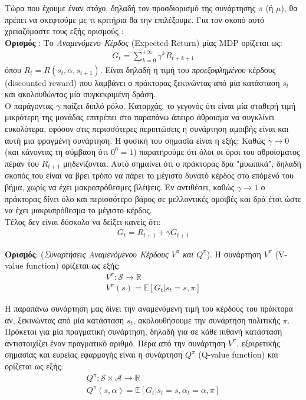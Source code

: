 \documentclass[11pt]{article} %
\numberwithin{equation}{subsection}
\begin{document}
Τώρα που έχουμε έναν στόχο, δηλαδή τον προσδιορισμό της συνάρτησης $\mathcal{\pi}$ (ή $\mu$), θα πρέπει να σκεφτούμε με τι κριτήρια θα την επιλέξουμε. Για τον σκοπό αυτό χρειαζόμαστε τους εξής ορισμούς \cite{valuefun}:\\

\textbf{Ορισμός} : Το \textit{Αναμενόμενο Κέρδος} (Expected Return) μίας MDP ορίζεται ως:
\begin{align*} 
\displaystyle G_t = \sum_{k=0}^{+\infty} \gamma^k R_{t+k+1}
\end{align*}
όπου $R_t = R(s_t, \alpha, s_{t+1})$. Είναι δηλαδή η τιμή του \textit{προεξοφλημένου} κέρδους (discounted reward) που λαμβάνει ο πράκτορας ξεκινώντας από μία κατάσταση $s_t$ και ακολουθώντας μία συγκεκριμένη δράση. \\

Ο παράγοντας $\gamma$ παίζει διπλό ρόλο. Καταρχάς, το γεγονός ότι είναι μία σταθερή τιμή μικρότερη της μονάδας επιτρέπει στο παραπάνω άπειρο άθροισμα να συγκλίνει ευκολότερα, εφόσον στις περισσότερες περιπτώσεις η συνάρτηση αμοιβής είναι και αυτή μια φραγμένη συνάρτηση. Η φυσική του σημασία είναι η εξής: Καθώς $\gamma \rightarrow 0$ (και κάνοντας τη σύμβαση ότι $0^0 = 1$) παρατηρούμε ότι όλοι οι όροι του αθροίσματος πέραν του $R_{t+1}$ μηδενίζονται. Αυτό σημαίνει ότι ο πράκτορας δρα "μυωπικά", δηλαδή σκοπός του είναι να βρει τρόπο να πάρει το μέγιστο δυνατό κέρδος στο επόμενό του βήμα, χωρίς να έχει μακροπρόθεσμες βλέψεις. Εν αντιθέσει, καθώς $\gamma \rightarrow 1$ ο πράκτορας δίνει όλο και περισσότερο βάρος σε μελλοντικές αμοιβές και δρά έτσι ώστε να έχει μακρυπρόθεσμα το μέγιστο κέρδος.\\

Τέλος δεν είναι δύσκολο να δείξει κανείς ότι:
\begin{align*}
G_t = R_{t+1} + \gamma G_{t+1}
\end{align*}

\textbf{Ορισμός}: (\textit{Συναρτήσεις Αναμενόμενου Κέρδους $V^\pi$ και $Q^\pi$}). Η συνάρτηση $V^\pi$ (V-value function) ορίζεται ως εξής:
\begin{gather*}
V^\pi : \mathcal{S} \rightarrow \mathbb{R}\\
V^\pi (s) = \mathbb{E}\left[G_t | s_t = s, \mathcal{\pi} \right]
\end{gather*}

Η παραπάνω συνάρτηση μας δίνει την αναμενόμενη τιμή του κέρδους του πράκτορα αν, ξεκινώντας από μία κατάσταση $s_t$, ακολουθήσουμε την συνάρτηση πολιτικής $\mathcal{\pi}$. Πρόκεται για μία πραγματική συνάρτηση, δηλαδή για σε κάθε πιθανή κατάσταση αντιστοιχίζει έναν πραγματικό αριθμό. Πέρα από την συνάρτηση $V^\pi$, εξαιρετικής σημασίας και ευρείας εφαρμογής είναι η συνάρτηση $Q^\pi$ (Q-value function) και ορίζεται ως εξής:
\begin{gather*}
Q^\pi : \mathcal{S} \times \mathcal{A} \rightarrow \mathbb{R}\\
Q^\pi (s, \alpha) = \mathbb{E}\left[G_t | s_t = s, \alpha_t = \alpha, \mathcal{\pi} \right]
\end{gather*}
\end{document}
